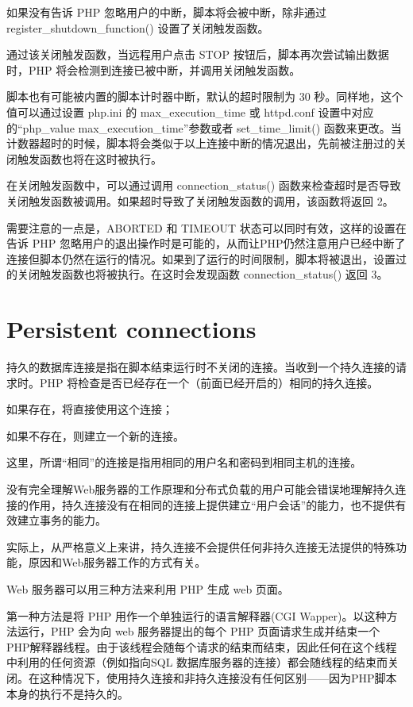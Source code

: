 如果没有告诉 PHP 忽略用户的中断，脚本将会被中断，除非通过 register\_shutdown\_function() 设置了关闭触发函数。

通过该关闭触发函数，当远程用户点击 STOP 按钮后，脚本再次尝试输出数据时，PHP 将会检测到连接已被中断，并调用关闭触发函数。

脚本也有可能被内置的脚本计时器中断，默认的超时限制为 30 秒。同样地，这个值可以通过设置 php.ini 的 max\_execution\_time 或 httpd.conf 设置中对应的“php\_value max\_execution\_time”参数或者 set\_time\_limit() 函数来更改。当计数器超时的时候，脚本将会类似于以上连接中断的情况退出，先前被注册过的关闭触发函数也将在这时被执行。

在关闭触发函数中，可以通过调用 connection\_status() 函数来检查超时是否导致关闭触发函数被调用。如果超时导致了关闭触发函数的调用，该函数将返回 2。

需要注意的一点是，ABORTED 和 TIMEOUT 状态可以同时有效，这样的设置在告诉 PHP 忽略用户的退出操作时是可能的，从而让PHP仍然注意用户已经中断了连接但脚本仍然在运行的情况。如果到了运行的时间限制，脚本将被退出，设置过的关闭触发函数也将被执行。在这时会发现函数 connection\_status() 返回 3。

\section{Persistent connections}

持久的数据库连接是指在脚本结束运行时不关闭的连接。当收到一个持久连接的请求时。PHP 将检查是否已经存在一个（前面已经开启的）相同的持久连接。

\begin{compactitem}
\item 如果存在，将直接使用这个连接；
\item 如果不存在，则建立一个新的连接。
\end{compactitem}



这里，所谓“相同”的连接是指用相同的用户名和密码到相同主机的连接。

没有完全理解Web服务器的工作原理和分布式负载的用户可能会错误地理解持久连接的作用，持久连接没有在相同的连接上提供建立“用户会话”的能力，也不提供有效建立事务的能力。

实际上，从严格意义上来讲，持久连接不会提供任何非持久连接无法提供的特殊功能，原因和Web服务器工作的方式有关。

Web 服务器可以用三种方法来利用 PHP 生成 web 页面。

第一种方法是将 PHP 用作一个单独运行的语言解释器(CGI Wapper)。以这种方法运行，PHP 会为向 web 服务器提出的每个 PHP 页面请求生成并结束一个 PHP解释器线程。由于该线程会随每个请求的结束而结束，因此任何在这个线程中利用的任何资源（例如指向SQL 数据库服务器的连接）都会随线程的结束而关闭。在这种情况下，使用持久连接和非持久连接没有任何区别——因为PHP脚本本身的执行不是持久的。

